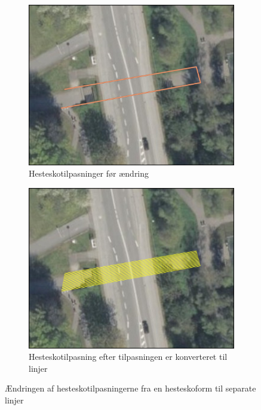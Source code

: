 \begin{figure}[H]
    \begin{subfigure}[t]{0.5\textwidth}
        \centering
        \includegraphics[width=1\linewidth]{images/databeskrivelse/hestesko.jpg}
        \caption{Hesteskotilpasninger før ændring}
        \label{Subfig: Hesteskotilpasninger før ændring}
    \end{subfigure}
    \hspace{0.2cm}
    \begin{subfigure}[t]{0.5\textwidth}
        \centering
        \includegraphics[width=1\linewidth]{images/metode/hestesko_linjer.jpg}
        \caption{Hesteskotilpasning efter tilpasningen er konverteret til linjer}
        \label{Subfig: Hesteskotilpasning efter tilpasningen er konverteret til linjer}
    \end{subfigure}
    \caption{Ændringen af hesteskotilpasningerne fra en hesteskoform til separate linjer}
    \label{Figur: Ændringen af hesteskotilpasningerne}
\end{figure}

